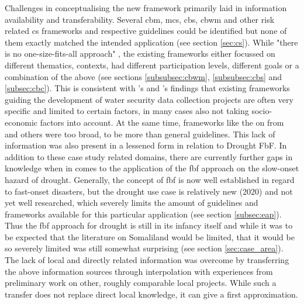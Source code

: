 Challenges in conceptualising the new framework primarily laid in information availability and transferability. Several \acrshort{cbm}, \acrshort{mcs}, \acrshort{cbs}, \acrshort{cbwm} and other risk related \acrshort{cs} frameworks and respective guidelines could be identified but none of them exactly matched the intended application (see section \ref{sec:cs}). While "there is no one-size-fits-all approach" \autocite[2]{fraislCitizenScienceEnvironmental2022}, the existing frameworks either focussed on different thematics, contexts, had different participation levels, different goals or a combination of the above (see sections \ref{subsubsec:cbwm}, \ref{subsubsec:cbs} and \ref{subsec:cbc}). This is consistent with \autocite{butteFrameworkWaterSecurity2022}'s and \autocite{carrionCROWDSOURCINGWATERQUALITY2020}'s findings that existing frameworks guiding the development of water security data collection projects are often very specific and limited to certain factors, in many cases also not taking socio-economic factors into account. At the same time, frameworks like the on from \autocite{butteFrameworkWaterSecurity2022,eu-citizen.scienceEUCitizenScience,citizenscience.govBasicStepsYour} and others were too broad, to be more than general guidelines.
This lack of information was also present in a lessened form in relation to Drought FbF. In addition to these case study related domains, there are currently further gaps in knowledge when in comes to the application of the \acrshort{fbf} approach on the slow-onset hazard of drought. Generally, the concept of \acrshort{fbf} is now well established in regard to fast-onset disasters, but the drought use case is relatively new (2020) and not yet well researched, which severely limits the amount of guidelines and frameworks available for this particular application (see section \ref{subsec:eap}). Thus the \acrshort{fbf} approach for drought is still in its infancy itself and while it was to be expected that the literature on Somaliland would be limited, that it would be so severely limited was still somewhat surprising (see section \ref{sec:case_area}). The lack of local and directly related information was overcome by transferring the above information sources through interpolation with experiences from preliminary work on other, roughly comparable local projects. While such a transfer does not replace direct local knowledge, it can give a first approximation.\newline
